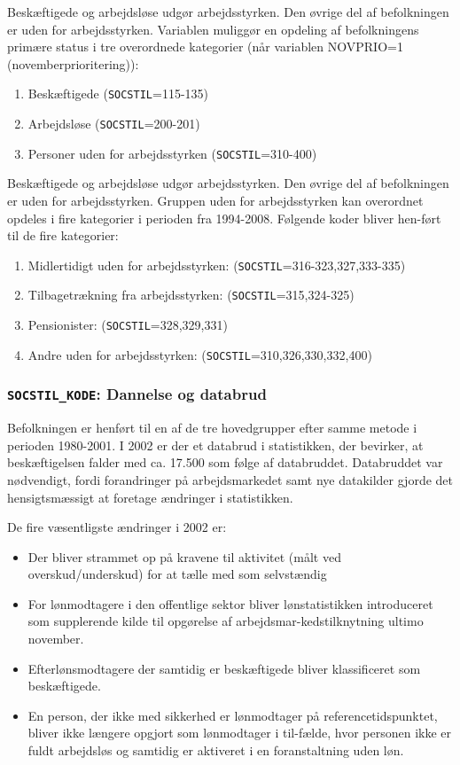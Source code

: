 {Beskæftigede og arbejdsløse udgør arbejdsstyrken. Den øvrige del af befolkningen er uden for arbejdsstyrken.
Variablen muliggør en opdeling af befolkningens primære status i tre overordnede kategorier (når variablen NOVPRIO=1 (novemberprioritering)):
\begin{enumerate} [topsep=6pt,itemsep=-1ex]
  \item Beskæftigede (\texttt{SOCSTIL}=115-135)
  \item Arbejdsløse (\texttt{SOCSTIL}=200-201)
  \item Personer uden for arbejdsstyrken (\texttt{SOCSTIL}=310-400)
\end{enumerate}

Beskæftigede og arbejdsløse udgør arbejdsstyrken. Den øvrige del af befolkningen er uden for arbejdsstyrken. Gruppen uden for arbejdsstyrken kan overordnet opdeles i fire kategorier i perioden fra 1994-2008. Følgende koder bliver hen-ført til de fire kategorier:
\begin{enumerate} [topsep=6pt,itemsep=-1ex]
  \item Midlertidigt uden for arbejdsstyrken: (\texttt{SOCSTIL}=316-323,327,333-335)
  \item Tilbagetrækning fra arbejdsstyrken: (\texttt{SOCSTIL}=315,324-325)
  \item Pensionister: (\texttt{SOCSTIL}=328,329,331)
  \item Andre uden for arbejdsstyrken: (\texttt{SOCSTIL}=310,326,330,332,400)
\end{enumerate}


\subsubsection{\texttt{SOCSTIL\_KODE}: Dannelse og databrud \label{}}

Befolkningen er henført til en af de tre hovedgrupper efter samme metode i perioden 1980-2001. I 2002 er der et databrud i statistikken, der bevirker, at beskæftigelsen falder med ca. 17.500 som følge af databruddet. Databruddet var nødvendigt, fordi forandringer på arbejdsmarkedet samt nye datakilder gjorde det hensigtsmæssigt at foretage ændringer i statistikken.

De fire væsentligste ændringer i 2002 er:
\begin{itemize} [topsep=6pt,itemsep=-1ex]
  \item Der bliver strammet op på kravene til aktivitet (målt ved overskud/underskud) for at tælle med som selvstændig
  \item For lønmodtagere i den offentlige sektor bliver lønstatistikken introduceret som supplerende kilde til opgørelse af arbejdsmar-kedstilknytning ultimo november.
  \item Efterlønsmodtagere der samtidig er beskæftigede bliver klassificeret som beskæftigede.
  \item En person, der ikke med sikkerhed er lønmodtager på referencetidspunktet, bliver ikke længere opgjort som lønmodtager i til-fælde, hvor personen ikke er fuldt arbejdsløs og samtidig er aktiveret i en foranstaltning uden løn.
 \end{itemize}

}
